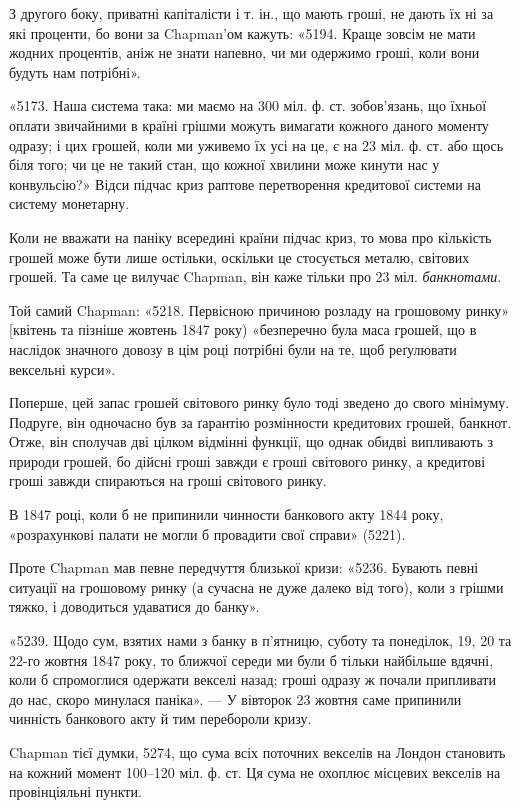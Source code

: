 
З другого боку, приватні капіталісти і т. ін., що мають гроші, не дають
їх ні за які проценти, бо вони за Chapman’ом кажуть: «5194. Краще зовсім не
мати жодних процентів, аніж не знати напевно, чи ми одержимо гроші, коли
вони будуть нам потрібні».

«5173. Наша система така: ми маємо на 300 міл. ф. ст. зобов’язань, що
їхньої оплати звичайними в країні грішми можуть вимагати кожного даного
моменту одразу; і цих грошей, коли ми уживемо їх усі на це, є на 23 міл.
ф. ст. або щось біля того; чи це не такий стан, що кожної хвилини може
кинути нас у конвульсію?» Відси підчас криз раптове перетворення кредитової
системи на систему монетарну.

Коли не вважати на паніку всередині країни підчас криз, то мова про
кількість грошей може бути лише остільки, оскільки це стосується металю, світових
грошей. Та саме це вилучає Chapman, він каже тільки про 23 міл.
\emph{банкнотами}.

Той самий Chapman: «5218. Первісною причиною розладу на грошовому
ринку» [квітень та пізніше жовтень 1847 року) «безперечно була маса грошей,
що в наслідок значного довозу в цім році потрібні були на те, щоб реґулювати
вексельні курси».

Поперше, цей запас грошей світового ринку було тоді зведено до свого
мінімуму. Подруге, він одночасно був за ґарантію розмінности кредитових грошей,
банкнот. Отже, він сполучав дві цілком відмінні функції, що однак обидві
випливають з природи грошей, бо дійсні гроші завжди є гроші світового ринку,
а кредитові гроші завжди спираються на гроші світового ринку.

В 1847 році, коли б не припинили чинности банкового акту 1844 року,
«розрахункові палати не могли б провадити свої справи» (5221).

Проте Chapman мав певне передчуття близької кризи: «5236. Бувають певні
ситуації на грошовому ринку (а сучасна не дуже далеко від того), коли з грішми
тяжко, і доводиться удаватися до банку».

«5239. Щодо сум, взятих нами з банку в п’ятницю, суботу та понеділок,
19, 20 та 22-го жовтня 1847 року, то ближчої середи ми були б тільки найбільше
вдячні, коли б спромоглися одержати векселі назад; гроші одразу ж
почали припливати до нас, скоро минулася паніка». — У вівторок 23 жовтня
саме припинили чинність банкового акту й тим перебороли кризу.

Chapman тієї думки, 5274, що сума всіх поточних векселів на Лондон
становить на кожний момент 100--120 міл. ф. ст. Ця сума не охоплює місцевих
векселів на провінціяльні пункти.

